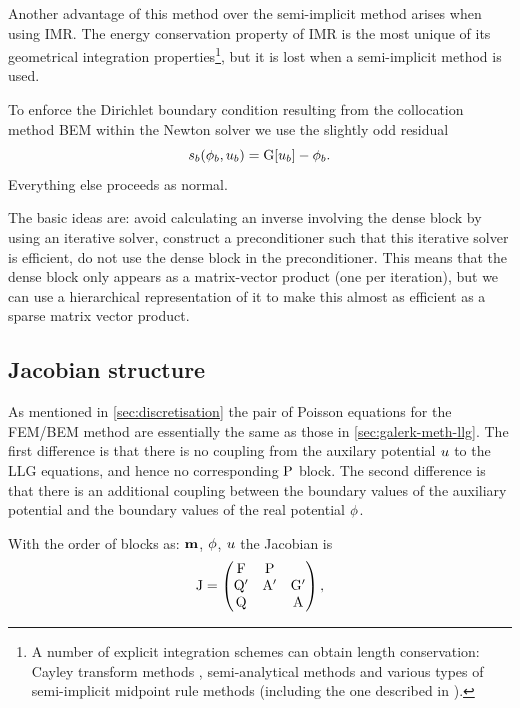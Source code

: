 Another advantage of this method over the semi-implicit method arises when using IMR.
The energy conservation property of IMR is the most unique of its geometrical integration properties\footnote{A number of explicit integration schemes can obtain length conservation: Cayley transform methods \cite{Lewis2003}, semi-analytical methods \cite{Wiele2010} and various types of semi-implicit midpoint rule methods \cite{Spargo2003} \cite{Mentink2010} (including the one described in ).}, but it is lost when a semi-implicit method is used.

To enforce the Dirichlet boundary condition resulting from the collocation method BEM within the Newton solver we use the slightly odd residual
\newcommand{\rphimb}{\rphi_b}
\begin{equation}
  \rphimb(\phim_b, \phione_b) = \bm[\phione_b] - \phim_b.
\end{equation}
Everything else proceeds as normal.

The basic ideas are: avoid calculating an inverse involving the dense block by using an iterative solver, construct a preconditioner such that this iterative solver is efficient, do not use the dense block in the preconditioner.
This means that the dense block only appears as a matrix-vector product (one per iteration), but we can use a hierarchical representation of it to make this almost as efficient as a sparse matrix vector product.


\subsection{Jacobian structure}
\label{sec:bem-jacobian-structure}

As mentioned in \cref{sec:discretisation} the pair of Poisson equations for the FEM/BEM method are essentially the same as those in \cref{sec:galerk-meth-llg}.
The first difference is that there is no coupling from the auxilary potential $u$ to the LLG equations, and hence no corresponding $\mathrm{P}$ block.
The second difference is that there is an additional coupling between the boundary values of the auxiliary potential and the boundary values of the real potential $\phi$.

With the order of blocks as: $\boldsymbol{\mathrm{m}}$, $\phi$, $u$ the Jacobian is
\begin{equation}
  \mathrm{J} = 
  \begin{pmatrix}
    \mathrm{F}       & \mathrm{P}     &  \\
    \mathrm{Q}'      & \mathrm{A}' &  {\mathbf{\mathrm{G}}}'  \\
    \mathrm{Q}       &         &   \mathrm{A}
  \end{pmatrix},
\label{eq:16}
\end{equation}

